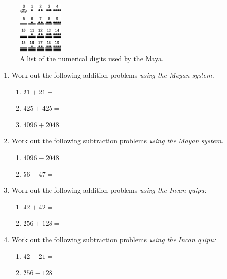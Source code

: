 \documentclass[10pt]{article}
\begin{document}
\begin{figure}[hb]
\centering
\includegraphics[width=0.2\textwidth]{figures/maya_digits.png}
\caption{\label{fig:digits} A list of the numerical digits used by the Maya.}
\end{figure}
\begin{enumerate}
\item Work out the following addition problems \textit{using the Mayan system.}
\begin{enumerate}
\item $21 + 21 = $ \vspace{2cm}
\item $425 + 425 = $ \vspace{2cm}
\item $4096 + 2048 = $ \vspace{2cm}
\end{enumerate}
\item Work out the following subtraction problems \textit{using the Mayan system.}
\begin{enumerate}
\item $4096 - 2048 = $ \vspace{2cm}
\item $56 - 47 = $ \vspace{2cm}
\end{enumerate}
\item Work out the following addition problems \textit{using the Incan quipu:}
\begin{enumerate}
\item $42 + 42 = $ \vspace{2cm}
\item $256 + 128 = $ \vspace{2cm}
\end{enumerate}
\item Work out the following subtraction problems \textit{using the Incan quipu:}
\begin{enumerate}
\item $42 - 21 = $ \vspace{2cm}
\item $256 - 128 = $ \vspace{2cm}
\end{enumerate}

\end{enumerate}
\end{document}
